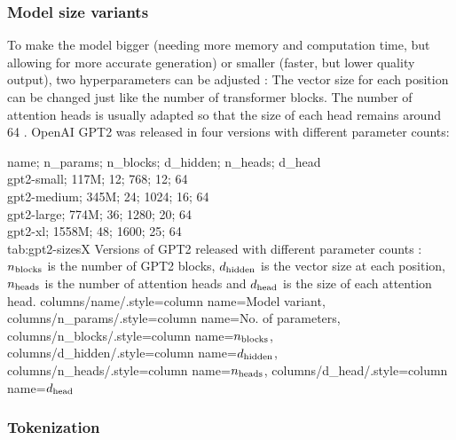 


\subsubsection{Model size variants}

\label{gpt2:parameters}

To make the model bigger (needing more memory and computation time, but allowing for more accurate generation) or smaller (faster, but lower quality output), two hyperparameters can be adjusted  : The vector size for each position can be changed just like the number of transformer blocks. The number of attention heads is usually adapted so that the size of each head remains around 64  \cite{hfpretrained}.
OpenAI GPT2 was released in four versions with different parameter counts:

{
	name; n_params; n_blocks; d_hidden; n_heads; d_head\\
	gpt2-small; 117M; 12; 768; 12; 64 \\
	gpt2-medium; 345M; 24; 1024; 16; 64 \\
	gpt2-large; 774M; 36; 1280; 20; 64 \\
	gpt2-xl; 1558M; 48; 1600; 25; 64 \\
}
{tab:gpt2-sizesX}
{
	Versions of GPT2 released with different parameter counts \cite{hfpretrained}: ${n_\textrm{blocks}}$ is the number of GPT2 blocks, ${d_\textrm{hidden}}$ is the vector size at each position, ${n_\textrm{heads}}$ is the number of attention heads and ${d_\textrm{head}}$ is the size of each attention head.
}
{%
	columns/name/.style={column name={Model variant}},
	columns/n_params/.style={column name={No. of parameters}},
	columns/n_blocks/.style={column name={${n_\textrm{blocks}}$}},
	columns/d_hidden/.style={column name={${d_\textrm{hidden}}$}},
	columns/n_heads/.style={column name={${n_\textrm{heads}}$}},
	columns/d_head/.style={column name={${d_\textrm{head}}$}}
}


\subsubsection{Tokenization}


